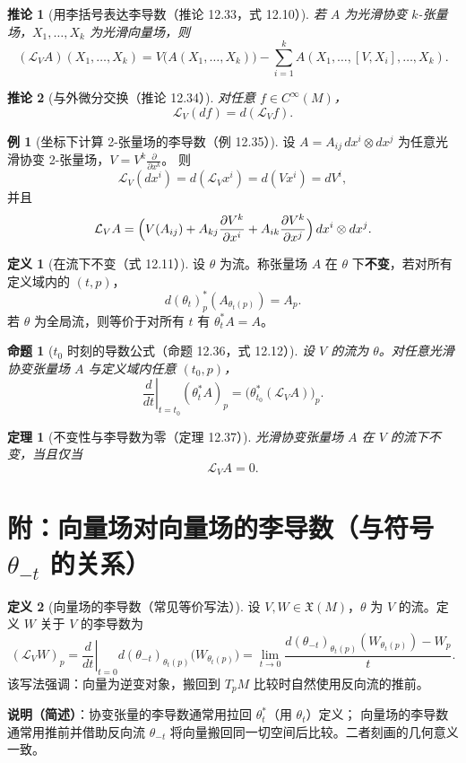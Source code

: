 \documentclass[11pt]{article}
\theoremstyle{definition}
\newtheorem{definition}{定义}[section]
\newtheorem{example}{例}[section]
\theoremstyle{plain}
\newtheorem{proposition}{命题}[section]
\newtheorem{theorem}{定理}[section]
\newtheorem{corollary}{推论}[section]
\newcommand{\Cinf}{C^{\infty}}
\newcommand{\X}{\mathfrak{X}}
\newcommand{\Lie}{\mathcal{L}}
\newcommand{\ot}{\otimes}
\begin{document}
\begin{corollary}[用李括号表达李导数（推论 12.33，式 12.10）]
若 $A$ 为光滑协变 $k$-张量场，$X_1,\dots,X_k$ 为光滑向量场，则
\[
(\Lie_VA)(X_1,\dots,X_k)
=V\big(A(X_1,\dots,X_k)\big)
-\sum_{i=1}^k A(X_1,\dots,[V,X_i],\dots,X_k).
\]
\end{corollary}

\begin{corollary}[与外微分交换（推论 12.34）]
对任意 $f\in\Cinf(M)$，
\[
\Lie_V(df)=d(\Lie_V f).
\]
\end{corollary}

\begin{example}[坐标下计算 2-张量场的李导数（例 12.35）]
设 $A=A_{ij}\,dx^i\ot dx^j$ 为任意光滑协变 2-张量场，$V=V^k\frac{\partial}{\partial x^k}$。
则
\[
\Lie_V(dx^i)=d(\Lie_V x^i)=d(Vx^i)=dV^i,
\]
并且
\[
\Lie_VA
=\Bigl(V(A_{ij})+A_{kj}\frac{\partial V^k}{\partial x^i}+A_{ik}\frac{\partial V^k}{\partial x^j}\Bigr)\,dx^i\ot dx^j.
\]
\end{example}

\begin{definition}[在流下不变（式 12.11）]
设 $\theta$ 为流。称张量场 $A$ 在 $\theta$ 下\textbf{不变}，若对所有定义域内的 $(t,p)$，
\[
d(\theta_t)_p^*(A_{\theta_t(p)})=A_p.
\]
若 $\theta$ 为全局流，则等价于对所有 $t$ 有 $\theta_t^*A=A$。
\end{definition}

\begin{proposition}[$t_0$ 时刻的导数公式（命题 12.36，式 12.12）]
设 $V$ 的流为 $\theta$。对任意光滑协变张量场 $A$ 与定义域内任意 $(t_0,p)$，
\[
\left.\frac{d}{dt}\right|_{t=t_0}(\theta_t^*A)_p
=\bigl(\theta_{t_0}^*(\Lie_VA)\bigr)_p.
\]
\end{proposition}

\begin{theorem}[不变性与李导数为零（定理 12.37）]
光滑协变张量场 $A$ 在 $V$ 的流下不变，当且仅当
\[
\Lie_VA=0.
\]
\end{theorem}

\section{附：向量场对向量场的李导数（与符号 $\theta_{-t}$ 的关系）}

\begin{definition}[向量场的李导数（常见等价写法）]
设 $V,W\in\X(M)$，$\theta$ 为 $V$ 的流。定义 $W$ 关于 $V$ 的李导数为
\[
(\Lie_VW)_p
=\left.\frac{d}{dt}\right|_{t=0} d(\theta_{-t})_{\theta_t(p)}\big(W_{\theta_t(p)}\big)
=\lim_{t\to 0}\frac{d(\theta_{-t})_{\theta_t(p)}(W_{\theta_t(p)})-W_p}{t}.
\]
该写法强调：向量为逆变对象，搬回到 $T_pM$ 比较时自然使用反向流的推前。
\end{definition}

\vspace{1em}
\noindent\textbf{说明（简述）}：协变张量的李导数通常用拉回 $\theta_t^*$（用 $\theta_t$）定义；
向量场的李导数通常用推前并借助反向流 $\theta_{-t}$ 将向量搬回同一切空间后比较。二者刻画的几何意义一致。
\end{document}
